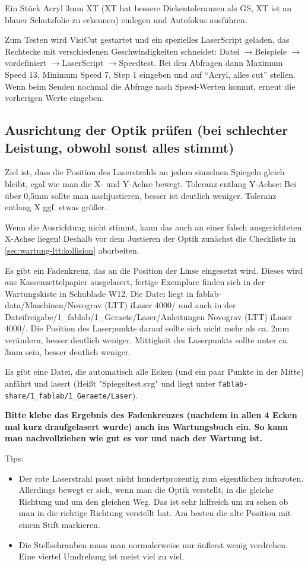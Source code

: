 \documentclass{\basedir/fablab-document}
\newcommand{\pfeil}{\ensuremath{\rightarrow}}
\begin{document}
Ein Stück Acryl 3mm XT (XT hat bessere Dickentoleranzen als GS, XT ist an blauer Schutzfolie zu erkennen) einlegen und Autofokus ausführen.

Zum Testen wird VisiCut gestartet und ein spezielles LaserScript geladen, das Rechtecke mit verschiedenen Geschwindigkeiten schneidet: Datei \pfeil Beispiele \pfeil vordefiniert \pfeil LaserScript \pfeil Speedtest. Bei den Abfragen dann Maximum Speed 13, Minimum Speed 7, Step 1 eingeben und auf \enquote{Acryl, alles cut} stellen. Wenn beim Senden nochmal die Abfrage nach Speed-Werten kommt, erneut die vorherigen Werte eingeben.




\subsection{Ausrichtung der Optik prüfen (bei schlechter Leistung, obwohl sonst alles stimmt)}\label{ltt-wartung-optik}
Ziel ist, dass die Position des Laserstrahls an jedem einzelnen Spiegeln gleich bleibt, egal wie man die X- und Y-Achse bewegt. Toleranz entlang Y-Achse: Bei über 0,5mm sollte man nachjustieren, besser ist deutlich weniger. Toleranz entlang X ggf. etwas größer.

Wenn die Ausrichtung nicht stimmt, kann das auch an einer falsch ausgerichteten X-Achse liegen! Deshalb vor dem Justieren der Optik zunächst die Checkliste in \cref{sec:wartung-ltt:kollision} abarbeiten.

Es gibt ein Fadenkreuz, das an die Position der Linse eingesetzt wird. Dieses wird aus Kassenzettelpapier ausgelasert, fertige Exemplare finden sich in der Wartungskiste in Schublade W12. Die Datei liegt in fablab-data/Maschinen/Novograv (LTT) iLaser 4000/ und auch in der Dateifreigabe/1\_fablab/1\_Geraete/Laser/Anleitungen Novograv  (LTT) iLaser 4000/. Die Position des Laserpunkts darauf sollte sich nicht mehr als ca. 2mm verändern, besser deutlich weniger. Mittigkeit des Laserpunkts sollte unter ca. 3mm sein, besser deutlich weniger.

Es gibt eine Datei, die automatisch alle Ecken (und ein paar Punkte in der Mitte) anfährt und lasert (Heißt "Spiegeltest.svg" und liegt unter \verb|fablab-share/1_fablab/1_Geraete/Laser|).

\textbf{Bitte klebe das Ergebnis des Fadenkreuzes (nachdem in allen 4 Ecken mal kurz draufgelasert wurde) auch ins Wartungsbuch ein. So kann man nachvollziehen wie gut es vor und nach der Wartung ist.}

Tips:
\begin{itemize}
	\item Der rote Laserstrahl passt nicht hundertprozentig zum eigentlichen infraroten. Allerdings bewegt er sich, wenn man die Optik verstellt, in die gleiche Richtung und um den gleichen Weg. Das ist sehr hilfreich um zu sehen ob man in die richtige Richtung verstellt hat. Am besten die alte Position mit einem Stift markieren.

	\item Die Stellschrauben muss man normalerweise nur äußerst wenig verdrehen. Eine viertel Umdrehung ist meist viel zu viel.
\end{itemize}
\end{document}
